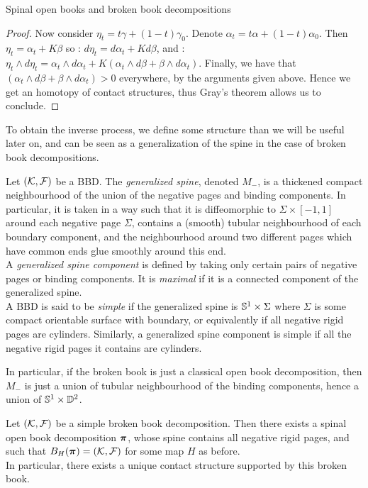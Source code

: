\documentclass[../main.tex]{subfiles}
\begin{document}
\begin{section}{Spinal open books and broken book decompositions}
\begin{proof}
Now consider $\eta_t = t\gamma + (1-t)\gamma_0$. Denote $\alpha_t = t\alpha + (1-t)\alpha_0$. Then $\eta_t = \alpha_t + K\beta$ so : $d\eta_t = d\alpha_t + Kd\beta$, and : $\eta_t \wedge d\eta_t = \alpha_t\wedge d\alpha_t + K(\alpha_t\wedge d\beta + \beta \wedge d\alpha_t)$. Finally, we have that $(\alpha_t\wedge d\beta + \beta \wedge d\alpha_t)>0$ everywhere, by the arguments given above. Hence we get an homotopy of contact structures, thus Gray's theorem allows us to conclude.

\end{proof}
To obtain the inverse process, we define some structure than we will be useful later on, and can be seen as a generalization of the spine in the case of broken book decompositions. 

\begin{definition}
Let $(\mathcal{K},\mathcal{F})$ be a BBD. The \textit{generalized spine}, denoted $M_-$, is a thickened compact neighbourhood of the union of the negative pages and binding components. In particular, it is taken in a way such that it is diffeomorphic to $\Sigma\times [-1,1]$ around each negative page $\Sigma$, contains a (smooth) tubular neighbourhood of each boundary component, and the neighbourhood around two different pages which have common ends glue smoothly around this end. \\
A \textit{generalized spine component} is defined by taking only certain pairs of negative pages or binding components. It is \textit{maximal} if it is a connected component of the generalized spine. \\
A BBD is said to be \textit{simple} if the generalized spine is $\mathbb{S}^1\times \Sigma$ where $\Sigma$ is some compact orientable surface with boundary, or equivalently if all negative rigid pages are cylinders. Similarly, a generalized spine component is simple if all the negative rigid pages it contains are cylinders. 
\end{definition}

In particular, if the broken book is just a classical open book decomposition, then $M_-$ is just a union of tubular neighbourhood of the binding components, hence a union of $\mathbb{S}^1\times \mathbb{D}^2$.

\begin{lemma}
    Let $(\mathcal{K},\mathcal{F})$ be a simple broken book decomposition. Then there exists a spinal open book decomposition $\boldsymbol{\pi}$, whose spine contains all negative rigid pages, and such that $B_H(\boldsymbol{\pi}) = (\mathcal{K},\mathcal{F})$ for some map $H$ as before. \\In particular, there exists a unique contact structure supported by this broken book.
\end{lemma}


\end{section}
\end{document}
